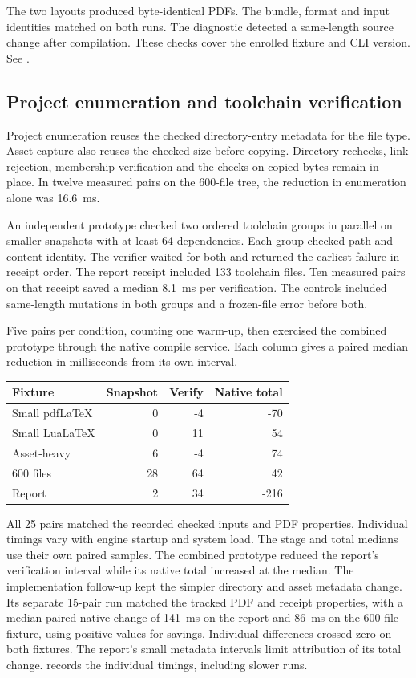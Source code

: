 The two layouts produced byte-identical PDFs. The bundle, format and
input identities matched on both runs. The diagnostic detected a
same-length source change after compilation. These checks cover the
enrolled fixture and CLI version. See
.

\subsection{Project enumeration and toolchain verification}

Project enumeration reuses the checked directory-entry metadata for the
file type. Asset capture also reuses the checked size before copying.
Directory rechecks, link rejection, membership verification and the
checks on copied bytes remain in place. In twelve measured pairs on the
600-file tree, the reduction in enumeration alone was 16.6~ms.

An independent prototype checked two ordered toolchain groups in parallel
on smaller snapshots with at least 64 dependencies. Each group checked
path and content identity. The verifier waited for both and returned the
earliest failure in receipt order. The report receipt included 133
toolchain files. Ten measured pairs on that receipt saved a median
8.1~ms per verification. The controls included same-length
mutations in both groups and a frozen-file error before both.

Five pairs per condition, counting one warm-up, then exercised the
combined prototype through the native compile service. Each column gives a
paired median reduction in milliseconds from its own interval.

\begin{center}
\small
\begin{tabular}{lrrr}
\toprule
Fixture & Snapshot & Verify & Native total \\
\midrule
Small pdf\LaTeX{} & 0 & -4 & -70 \\
Small Lua\LaTeX{} & 0 & 11 & 54 \\
Asset-heavy & 6 & -4 & 74 \\
600 files & 28 & 64 & 42 \\
Report & 2 & 34 & -216 \\
\bottomrule
\end{tabular}
\end{center}

All 25 pairs matched the recorded checked inputs and PDF properties.
Individual timings vary with engine startup and system load. The stage
and total medians use their own paired samples. The combined prototype
reduced the report's verification interval while its native total
increased at the median. The implementation follow-up kept the simpler
directory and asset metadata change. Its separate 15-pair run matched
the tracked PDF and receipt properties, with a median paired native
change of 141~ms on the report and 86~ms on the
600-file fixture, using positive values for savings.
Individual differences crossed zero on both fixtures. The report's
small metadata intervals limit attribution of its total change.
records the individual timings, including slower runs.

